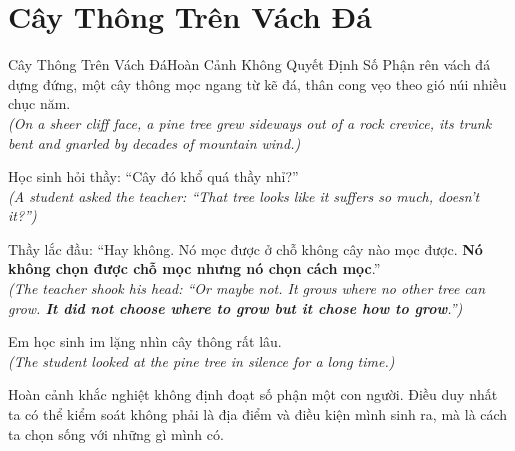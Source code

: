 \section{Cây Thông Trên Vách Đá}
\begin{truyen}{Cây Thông Trên Vách Đá}{Hoàn Cảnh Không Quyết Định Số Phận}
rên vách đá dựng đứng, một cây thông mọc ngang từ kẽ đá, thân cong vẹo theo gió núi nhiều chục năm.\\
\textit{(On a sheer cliff face, a pine tree grew sideways out of a rock crevice, its trunk bent and gnarled by decades of mountain wind.)}

Học sinh hỏi thầy: ``Cây đó khổ quá thầy nhỉ?''\\
\textit{(A student asked the teacher: ``That tree looks like it suffers so much, doesn't it?'')}

Thầy lắc đầu: ``Hay không. Nó mọc được ở chỗ không cây nào mọc được. \textbf{Nó không chọn được chỗ mọc nhưng nó chọn cách mọc}.''\\
\textit{(The teacher shook his head: ``Or maybe not. It grows where no other tree can grow. \textbf{It did not choose where to grow but it chose how to grow}.'')}

Em học sinh im lặng nhìn cây thông rất lâu.\\
\textit{(The student looked at the pine tree in silence for a long time.)}
\end{truyen}
\begin{baihoc}
  Hoàn cảnh khắc nghiệt không định đoạt số phận một con người. Điều duy nhất ta có thể kiểm soát không phải là địa điểm và điều kiện mình sinh ra, mà là cách ta chọn sống với những gì mình có.
\end{baihoc}

